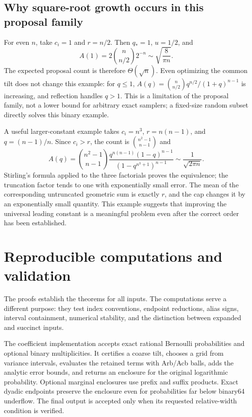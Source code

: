 \documentclass[11pt,a4paper]{article}
\theoremstyle{definition}
\begin{document}
\subsection{Why square-root growth occurs in this proposal family}

For even $n$, take $c_i=1$ and $r=n/2$. Then $q_*=1$, $u=1/2$, and
\[
 A(1)=2\binom n{n/2}2^{-n}\sim\sqrt{\frac8{\pi n}}.
\]
The expected proposal count is therefore $\Theta(\sqrt n)$. Even optimizing the common tilt does not change this example: for $q\le1$,
$A(q)=\binom n{n/2}q^{n/2}/(1+q)^{n-1}$ is increasing, and reflection handles $q>1$. This is a limitation of the proposal family, not a lower bound for arbitrary exact samplers; a fixed-size random subset directly solves this binary example.

A useful larger-constant example takes $c_i=n^3$, $r=n(n-1)$, and $q=(n-1)/n$. Since $c_i>r$, the count is $\binom{n^2-1}{n-1}$ and
\begin{equation}\label{eq:geomsharp}
 A(q)=\binom{n^2-1}{n-1}
 \frac{q^{n(n-1)}(1-q)^{n-1}}{(1-q^{n^3+1})^{n-1}}
 \sim\frac1{\sqrt{2\pi n}}.
\end{equation}
Stirling's formula applied to the three factorials proves the equivalence; the truncation factor tends to one with exponentially small error. The mean of the corresponding untruncated geometric sum is exactly $r$, and the cap changes it by an exponentially small quantity. This example suggests that improving the universal leading constant is a meaningful problem even after the correct order has been established.

\section{Reproducible computations and validation}\label{sec:experiments}

The proofs establish the theorems for all inputs. The computations serve a different purpose: they test index conventions, endpoint reductions, alias signs, interval containment, numerical stability, and the distinction between expanded and succinct inputs.

The coefficient implementation accepts exact rational Bernoulli probabilities and optional binary multiplicities. It certifies a coarse tilt, chooses a grid from variance intervals, evaluates the retained terms with Arb/Acb balls, adds the analytic error bounds, and returns an enclosure for the original logarithmic probability. Optional marginal enclosures use prefix and suffix products. Exact dyadic endpoints preserve the enclosure even for probabilities far below binary64 underflow. The final output is accepted only when its requested relative-width condition is verified.
\end{document}
